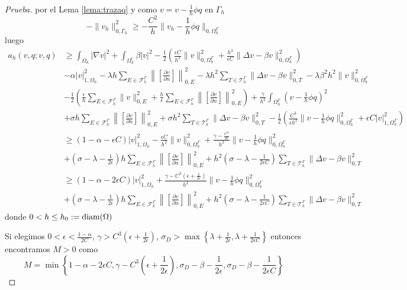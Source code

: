 \begin{proof}[Prueba]
	por el Lema \ref{lema:trazaq} y como $v=v-\frac{1}{h}\phi q$ en $\Gamma_h$
	\[
	-\|v_h\|^2_{0,\Gamma_h} \geq - \frac{C^2}{h} \|v_h-\frac{1}{h}\phi q\|_{0,\Omega^\Gamma_h}\]
	luego
	\[
	\begin{aligned}	
		a_h(v,q;v,q)&\geq \int_{\Omega_h} |\nabla v |^2 + \int_{\Omega^i_h} \beta|v|^2 -
		\frac{1}{2} \left(\frac{ \epsilon C }{h^2} \|  v \|^2_{0,\Omega_h^\Gamma} + \frac{h^2}{\epsilon C}
		\|\Delta v-\beta v \|^2_{0,\Omega_h^\Gamma}
		\right)	\\	
		&-\alpha |v|^2_{1,\Omega_h} - \lambda h \sum_{E\in \mathcal{F}_h^\Gamma}\left\| \left[ \frac{\partial v}{\partial n}\right] \right\|^2_{0,E} -\lambda h^2 \sum_{T\in \mathcal{T}_h^\Gamma} \|\Delta v-\beta v\|^2_{0,T} - \lambda\beta^2 h^2 \|v\|^2_{0,\Omega_h^\Gamma}\\
		&
		-\frac{1}{2} \left( \frac{\epsilon}{h} \sum_{E\in \mathcal{F}_h^\Gamma} \|v\|^2_{0,E} + \frac{h}{\epsilon }
		\sum_{E\in \mathcal{F}_h^\Gamma}\left \| \left[\frac{\partial v}{\partial n} 
		\right] \right \|^2_{0,E} 
		\right)
		+ \frac{\gamma}{h^2}\int_{\Omega^\Gamma_h} (v-\frac{1}{h}\phi q)^2
		\\
		&	+		 \sigma h \sum_{E\in \mathcal{F}_h^\Gamma} \left\| \left[ \frac{\partial v}{\partial n} \right]\right \|^2_{0,E}+
		\sigma h^2 \sum_{T\in \mathcal{T}_h^\Gamma}  \|\Delta  v-\beta v\|^2_{0,T} -\frac{1}{2}\left(
		\frac{C^3}{\epsilon h^2}\|v-\frac{1}{h}\phi q\|^2_{0,\Omega^\Gamma_h} + \epsilon C| v |^2_{1,\Omega^\Gamma_h}
		\right)\\
		& \geq (1-\alpha- \epsilon C ) |v|^2_{1,\Omega_h}
		- \frac{\epsilon C}{h^2}   \|v\|^2_{0,\Omega_h^\Gamma}
		+ 	 \frac{\gamma-\frac{C^3}{2\epsilon }      }{h^2}\|v-\frac{1}{h}\phi q\|^2_{0,\Omega^\Gamma_h} \\
		& +		 (\sigma-\lambda-\frac{1}{2\epsilon}) h \sum_{E\in \mathcal{F}_h^\Gamma} \left\| \left[ \frac{\partial v}{\partial n} \right]\right \|^2_{0,E}+
		h^2(\sigma-\lambda-\frac{1}{2\epsilon C})  \sum_{T\in \mathcal{T}_h^\Gamma}  \|\Delta  v-\beta v\|^2_{0,T} \\
		& \geq (1-\alpha- 2\epsilon C ) |v|^2_{1,\Omega_h}		
		+ 	 \frac{\gamma- C^3 (\epsilon +\frac{1}{2\epsilon} ) }{h^2}\|v-\frac{1}{h}\phi q\|^2_{0,\Omega^\Gamma_h} \\
		& +		 (\sigma-\lambda-\frac{1}{2\epsilon}) h \sum_{E\in \mathcal{F}_h^\Gamma} \left\| \left[ \frac{\partial v}{\partial n} \right]\right \|^2_{0,E}+
		h^2(\sigma-\lambda-\frac{1}{2\epsilon C})  \sum_{T\in \mathcal{T}_h^\Gamma}  \|\Delta  v-\beta v\|^2_{0,T} 
	\end{aligned}
	\]
	donde $0<h\leq h_0:={\rm diam}(\Omega)$
	
	Si elegimos $0<\epsilon<\frac{1-\alpha}{2C}$, $\gamma> C^3 (\epsilon +\frac{1}{2\epsilon} )$, $\sigma_D > \max\left\{\lambda +\frac{1}{2\epsilon},
	\lambda +\frac{1}{2\epsilon C}\right\}$ entonces encontramos $M>0$ como
	\[
	M=\min\left\{1-\alpha-2\epsilon C,
	\gamma - C^3 (\epsilon +\frac{1}{2\epsilon} ),\sigma_D-\beta-\frac{1}{2\epsilon},\sigma_D-\beta-\frac{1}{2\epsilon C}
	\right\}\]
\end{proof}
